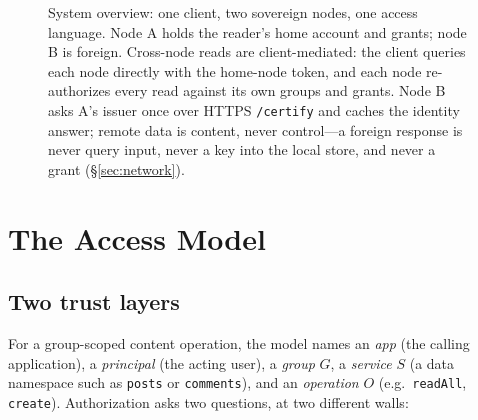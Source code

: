 \documentclass[sigconf, nonacm]{acmart}
\begin{document}
\begin{figure}[t]
\caption{System overview: one client, two sovereign nodes, one access language.
Node A holds the reader's home account and grants; node B is foreign. Cross-node
reads are client-mediated: the client queries each node directly with the
home-node token, and each node re-authorizes every read against its own groups
and grants. Node B asks A's issuer once over HTTPS \texttt{/certify} and caches
the identity answer; remote data is content, never control---a foreign response
is never query input, never a key into the local store, and never a grant
(\S\ref{sec:network}).}
\label{fig:overview}
\end{figure}

\section{The Access Model}
\label{sec:model}

\subsection{Two trust layers}

For a group-scoped content operation, the model names an \emph{app} (the
calling application), a \emph{principal} (the acting user), a \emph{group}
$G$, a \emph{service} $S$ (a data namespace such as \texttt{posts} or
\texttt{comments}), and an \emph{operation} $O$ (e.g.\ \texttt{readAll},
\texttt{create}). Authorization asks two questions, at two different walls:

\begin{center}
\small
{}
\end{center}
\end{document}
